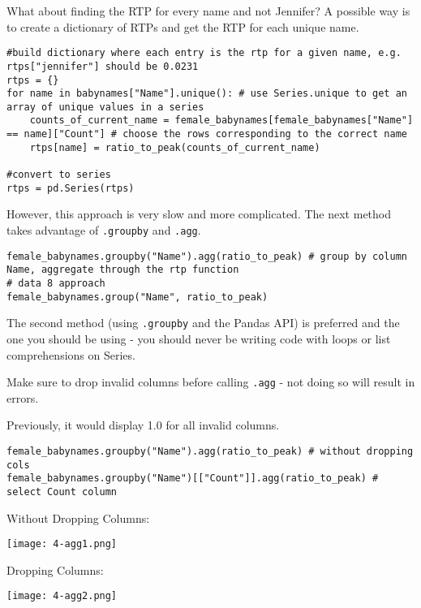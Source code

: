 What about finding the RTP for every name and not Jennifer? A possible way is to create a dictionary of RTPs and get the RTP for each unique name.
\begin{verbatim}
#build dictionary where each entry is the rtp for a given name, e.g. rtps["jennifer"] should be 0.0231
rtps = {}
for name in babynames["Name"].unique(): # use Series.unique to get an array of unique values in a series
    counts_of_current_name = female_babynames[female_babynames["Name"] == name]["Count"] # choose the rows corresponding to the correct name
    rtps[name] = ratio_to_peak(counts_of_current_name)

#convert to series
rtps = pd.Series(rtps)
\end{verbatim}
However, this approach is very slow and more complicated. The next method takes advantage of \texttt{.groupby} and \texttt{.agg}.

\begin{verbatim}
female_babynames.groupby("Name").agg(ratio_to_peak) # group by column Name, aggregate through the rtp function
# data 8 approach 
female_babynames.group("Name", ratio_to_peak)
\end{verbatim}

\begin{notebox}[]
The second method (using \texttt{.groupby} and the Pandas API) is preferred and the one you should be using - you should never be writing code with loops or list comprehensions on Series.
\end{notebox}

\begin{notebox}[]
Make sure to drop invalid columns before calling \texttt{.agg} - not doing so will result in errors.

Previously, it would display 1.0 for all invalid columns.

\begin{verbatim}
female_babynames.groupby("Name").agg(ratio_to_peak) # without dropping cols
female_babynames.groupby("Name")[["Count"]].agg(ratio_to_peak) # select Count column
\end{verbatim}

\begin{minipage}{0.5\textwidth}
Without Dropping Columns:
\begin{center}
\texttt{[image: 4-agg1.png]}
\end{center}
\end{minipage}
\begin{minipage}{0.5\textwidth}
Dropping Columns:
\begin{center}
\texttt{[image: 4-agg2.png]}
\end{center}
\end{minipage}
\end{notebox}

